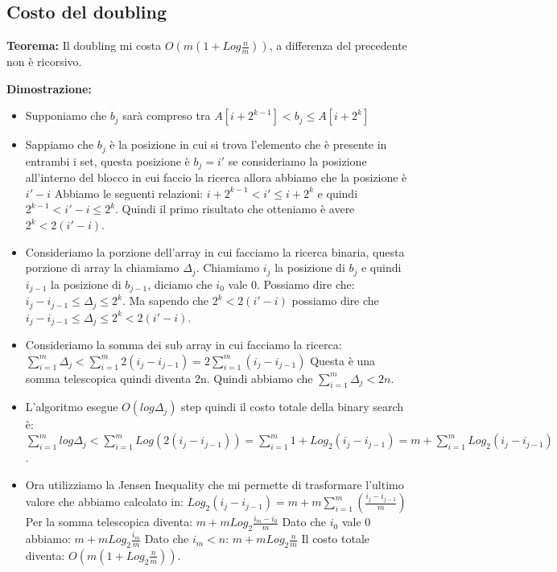 \documentclass[12pt]{article}
\begin{document}
\subsection{Costo del doubling}

\textbf{Teorema:} Il doubling mi costa $O(m(1+Log\frac{n}{m}))$, a differenza del precedente non è ricorsivo.

\textbf{Dimostrazione:} 

\begin{itemize}
\item Supponiamo che $b_j$ sarà compreso tra $A[i+2^{k-1}] < b_j \leq A[i+2^k]$
\item Sappiamo che $b_j$ è la posizione in cui si trova l'elemento che è presente in entrambi i set, questa posizione è $b_j=i'$ se consideriamo la posizione all'interno del blocco in cui faccio la ricerca allora abbiamo che la posizione è $i'-i$
Abbiamo le seguenti relazioni:
$i+2^{k-1} < i' \leq i+2^k$ e quindi $2^{k-1} < i' - i \leq 2^k$. Quindi il primo risultato che otteniamo è avere $2^k < 2(i'-i)$.
\item Consideriamo la porzione dell'array in cui facciamo la ricerca binaria, questa porzione di array la chiamiamo $\Delta_j$. Chiamiamo $i_j$ la posizione di $b_j$ e quindi $i_{j-1}$ la posizione di $b_{j-1}$, diciamo che $i_0$ vale 0. Possiamo dire che: $i_j - i_{j-1} \leq \Delta_j \leq 2^k$. Ma sapendo che $2^k < 2(i'-i)$ possiamo dire che $i_j - i_{j-1} \leq \Delta_j \leq 2^k < 2(i'-i)$.
\item Consideriamo la somma dei sub array in cui facciamo la ricerca:
$\sum_{i=1}^m \Delta_j < \sum_{i=1}^m 2(i_j - i_{j-1}) = 2\sum_{i=1}^m (i_j - i_{j-1})$ Questa è una somma telescopica quindi diventa 2n. Quindi abbiamo che $\sum_{i=1}^m \Delta_j < 2n$.
\item L'algoritmo esegue $O(log\Delta_j)$ step quindi il costo totale della binary search è:
$\sum_{i=1}^m log\Delta_j < \sum_{i=1}^m Log(2(i_j-i_{j-1})) = \sum_{i=1}^m 1 + Log_2(i_j-i_{j-1}) = m + \sum_{i=1}^m Log_2(i_j-i_{j-1})$.
\item Ora utilizziamo la Jensen Inequality che mi permette di trasformare l'ultimo valore che abbiamo calcolato in:
$Log_2(i_j-i_{j-1}) = m + m\sum_{i=1}^m(\frac{i_j-i_{j-1}}{m})$ 
Per la somma telescopica diventa:
$m + m Log_2\frac{i_m - i_0}{m}$
Dato che $i_0$ vale 0 abbiamo:
$m + m Log_2\frac{i_m}{m}$
Dato che $i_m < n$:
$m + m Log_2\frac{n}{m}$
Il costo totale diventa: $O(m(1+Log_2 \frac{n}{m}))$.
\end{itemize}
\end{document}
